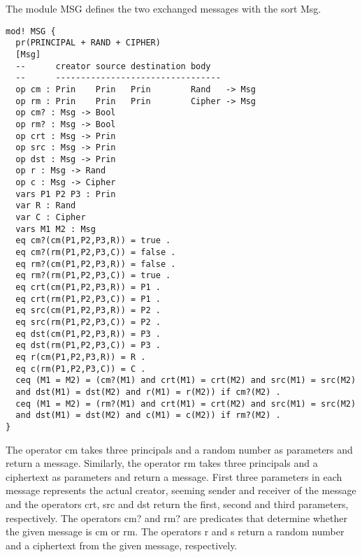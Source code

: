 \documentclass[a4paper,fleqn]{cas-dc}
\begin{document}
The module MSG defines the two exchanged messages with the sort Msg.
\begin{small}
\begin{verbatim}
mod! MSG {
  pr(PRINCIPAL + RAND + CIPHER)
  [Msg]
  --      creator source destination body
  --      ---------------------------------
  op cm : Prin    Prin   Prin        Rand   -> Msg
  op rm : Prin    Prin   Prin        Cipher -> Msg
  op cm? : Msg -> Bool
  op rm? : Msg -> Bool
  op crt : Msg -> Prin
  op src : Msg -> Prin
  op dst : Msg -> Prin
  op r : Msg -> Rand
  op c : Msg -> Cipher
  vars P1 P2 P3 : Prin
  var R : Rand
  var C : Cipher
  vars M1 M2 : Msg
  eq cm?(cm(P1,P2,P3,R)) = true .
  eq cm?(rm(P1,P2,P3,C)) = false .
  eq rm?(cm(P1,P2,P3,R)) = false .
  eq rm?(rm(P1,P2,P3,C)) = true .
  eq crt(cm(P1,P2,P3,R)) = P1 .
  eq crt(rm(P1,P2,P3,C)) = P1 .
  eq src(cm(P1,P2,P3,R)) = P2 .
  eq src(rm(P1,P2,P3,C)) = P2 .
  eq dst(cm(P1,P2,P3,R)) = P3 .
  eq dst(rm(P1,P2,P3,C)) = P3 .
  eq r(cm(P1,P2,P3,R)) = R .
  eq c(rm(P1,P2,P3,C)) = C .
  ceq (M1 = M2) = (cm?(M1) and crt(M1) = crt(M2) and src(M1) = src(M2)
  and dst(M1) = dst(M2) and r(M1) = r(M2)) if cm?(M2) .
  ceq (M1 = M2) = (rm?(M1) and crt(M1) = crt(M2) and src(M1) = src(M2)
  and dst(M1) = dst(M2) and c(M1) = c(M2)) if rm?(M2) .
}
\end{verbatim}
\end{small}
The operator cm takes three principals and a random number as parameters and return a message. Similarly, the operator rm takes three principals and a ciphertext as parameters and return a message. First three parameters in each message represents the actual creator, seeming sender and receiver of the message and the operators crt, src and dst return the first, second and third parameters, respectively. The operators cm? and rm? are predicates that determine whether the given message is cm or rm. The operators r and s return a random number and a ciphertext from the given message, respectively.
\end{document}
